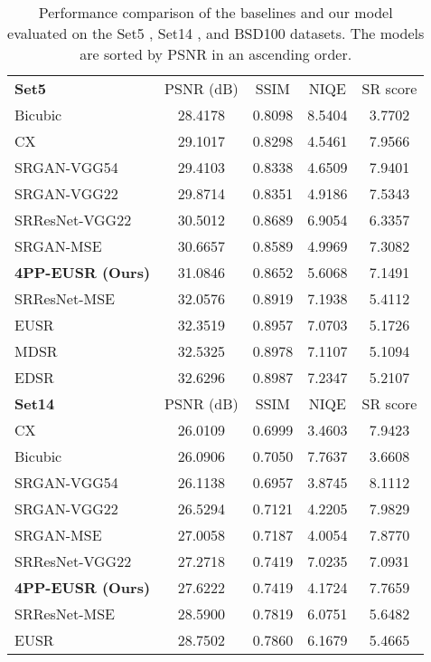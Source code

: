 \documentclass[runningheads]{llncs}
\begin{document}
\begin{table}[t]
	\scriptsize
	\centering
	\caption{Performance comparison of the baselines and our model evaluated on the Set5 \cite{bevilacqua2012low}, Set14 \cite{zeyde2010single}, and BSD100 \cite{martin2001database} datasets. The models are sorted by PSNR in an ascending order.}
	\label{table:result_baseline_comparison}
	\begin{tabular}{lcccc}
		\\
		\textbf{Set5} & PSNR (dB) & SSIM & NIQE & SR score \\
		\noalign{\smallskip}
		\hline
		\noalign{\smallskip}
		Bicubic & 28.4178 & 0.8098 & 8.5404 & 3.7702 \\
		CX & 29.1017 & 0.8298 & 4.5461 & 7.9566 \\
		SRGAN-VGG54 & 29.4103 & 0.8338 & 4.6509 & 7.9401 \\
		SRGAN-VGG22 & 29.8714 & 0.8351 & 4.9186 & 7.5343 \\
		SRResNet-VGG22 & 30.5012 & 0.8689 & 6.9054 & 6.3357 \\
		SRGAN-MSE & 30.6657 & 0.8589 & 4.9969 & 7.3082 \\
		\textbf{4PP-EUSR (Ours)} & 31.0846 & 0.8652 & 5.6068 & 7.1491 \\
		SRResNet-MSE & 32.0576 & 0.8919 & 7.1938 & 5.4112 \\
		EUSR & 32.3519 & 0.8957 & 7.0703 & 5.1726 \\
		MDSR & 32.5325 & 0.8978 & 7.1107 & 5.1094 \\
		EDSR & 32.6296 & 0.8987 & 7.2347 & 5.2107 \\
		\noalign{\smallskip}
		\noalign{\smallskip}
		\textbf{Set14} & PSNR (dB) & SSIM & NIQE & SR score \\
		\noalign{\smallskip}
		\hline
		\noalign{\smallskip}
		CX  & 26.0109 & 0.6999 & 3.4603 & 7.9423 \\
		Bicubic & 26.0906 & 0.7050 & 7.7637 & 3.6608 \\
		SRGAN-VGG54 & 26.1138 & 0.6957 & 3.8745 & 8.1112 \\
		SRGAN-VGG22 & 26.5294 & 0.7121 & 4.2205 & 7.9829 \\
		SRGAN-MSE & 27.0058 & 0.7187 & 4.0054 & 7.8770 \\
		SRResNet-VGG22 & 27.2718 & 0.7419 & 7.0235 & 7.0931 \\
		\textbf{4PP-EUSR (Ours)} & 27.6222 & 0.7419 & 4.1724 & 7.7659 \\
		SRResNet-MSE & 28.5900 & 0.7819 & 6.0751 & 5.6482 \\
		EUSR & 28.7502 & 0.7860 & 6.1679 & 5.4665 \\

\end{tabular}
\end{table}
\end{document}
